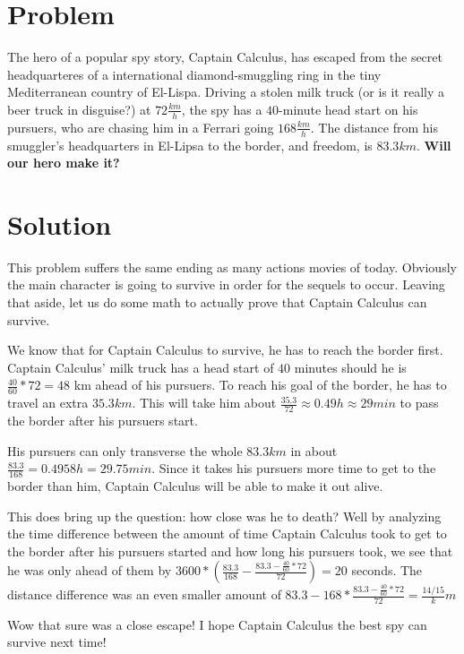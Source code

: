 \documentclass[titlepage]{article}
\title{Spy Problem #1}
\author{Kevin, Richard, Daniel, Andrew}
\begin{document}
\maketitle
\section{Problem}
The hero of a popular spy story, Captain Calculus, has escaped from the secret headquarteres of a international diamond-smuggling ring in the tiny Mediterranean country of El-Lispa. Driving a stolen milk truck (or is it really a beer truck in disguise?) at $72 \frac{km}{h}$, the spy has a $40$-minute head start on his pursuers, who are chasing him in a Ferrari going $168 \frac{km}{h}$. The distance from his smuggler's headquarters in El-Lipsa to the border, and freedom, is $83.3km$. \textbf{Will our hero make it?}
\section{Solution}
This problem suffers the same ending as many actions movies of today. Obviously the main character is going to survive in order for the sequels to occur. Leaving that aside, let us do some math to actually prove that Captain Calculus can survive.

We know that for Captain Calculus to survive, he has to reach the border first. Captain Calculus' milk truck has a head start of $40$ minutes should he is $\frac{40}{60}*72 = 48$ km ahead of his pursuers. To reach his goal of the border, he has to travel an extra $35.3km$. This will take him about $\frac{35.3}{72} \approx 0.49 h \approx 29 min$ to pass the border after his pursuers start.

His pursuers can only transverse the whole $83.3km$ in about $\frac{83.3}{168} = 0.4958 h = 29.75 min$. Since it takes his pursuers more time to get to the border than him, Captain Calculus will be able to make it out alive. 

This does bring up the question: how close was he to death? Well by analyzing the time difference between the amount of time Captain Calculus took to get to the border after his pursuers started and how long his pursuers took, we see that he was only ahead of them by $3600*(\frac{83.3}{168}-\frac{83.3-\frac{40}{60}*72}{72}) = 20$ seconds. The distance difference was an even smaller amount of $83.3-168*\frac{83.3-\frac{40}{60}*72}{72} = \frac{14/15} km$

Wow that sure was a close escape! I hope Captain Calculus the best spy can survive next time!
\end{document}
